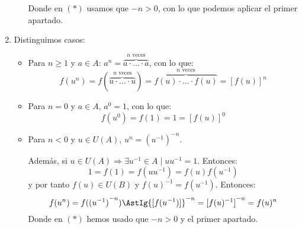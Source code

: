 \documentclass[12pt]{article}
\begin{document}
\begin{ejercicio}[3 puntos]
\begin{enumerate}[label=(\alph*)]
\begin{itemize}
                        Donde en $(\ast)$ usamos que $-n>0$, con lo que podemos aplicar el primer apartado.
                \end{itemize}
            \item Distinguimos casos:
                \begin{itemize}
                    \item Para $n\geq 1$ y $a\in A$: $a^n = \overbrace{a\cdot \ldots\cdot a}^{n \text{\ veces}} $, con lo que:
                        \begin{equation*}
                            f(u^n) = f(\overbrace{u\cdot \ldots\cdot u}^{n \text{\ veces}} ) =  \overbrace{f(u)\cdot \ldots\cdot f(u)}^{n \text{\ veces}} = {[f(u)]}^{n}
                        \end{equation*}
                    \item Para $n=0$ y $a\in A$, $a^0 = 1$, con lo que:
                        \begin{equation*}
                            f(u^0) = f(1) = 1 = {[f(u)]}^0
                        \end{equation*}
                    \item Para $n<0$ y $u\in U(A)$, $u^n = {(u^{-1})}^{-n}$.

                        Además, si $u\in U(A) \Longrightarrow \exists u^{-1}\in A \mid uu^{-1} = 1$. Entonces:
                        \begin{equation*}
                            1 = f(1) = f(uu^{-1}) = f(u)f(u^{-1})
                        \end{equation*}
                        y por tanto $f(u)\in U(B)$ y $f(u)^{-1} = f(u^{-1})$. Entonces:
                        \begin{equation*}
                            f(u^n) = f({(u^{-1})}^{-n}) \AstIg {[f(u^{-1})]}^{-n} = {[f(u)^{-1}]}^{-n} = f(u)^n
                        \end{equation*}
                        Donde en $(\ast)$ hemos usado que $-n>0$ y el primer apartado.
                \end{itemize}
        \end{enumerate}
    \end{ejercicio}
\end{document}
